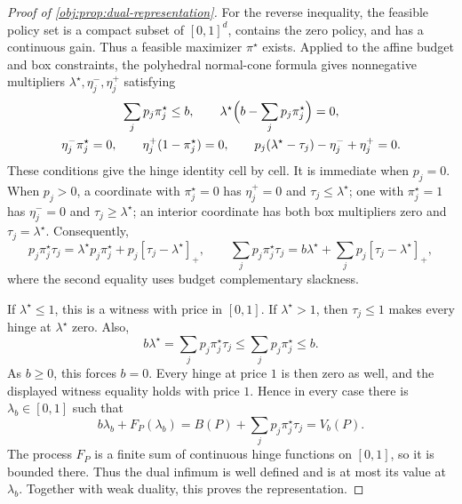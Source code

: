 \documentclass[11pt]{article}
\begin{document}
\begin{proof}[Proof of \cref{obj:prop:dual-representation}]
For the reverse inequality, the feasible policy set is a compact subset of \([0,1]^d\), contains the zero policy, and has a continuous gain. Thus a feasible maximizer \(\pi^\star\) exists. Applied to the affine budget and box constraints, the polyhedral normal-cone formula gives nonnegative multipliers \(\lambda^\star,\eta_j^-,\eta_j^+\) satisfying
\[
\begin{gathered}
\sum_jp_j\pi^\star_j\leq b,\qquad
\lambda^\star\Bigl(b-\sum_jp_j\pi^\star_j\Bigr)=0,\\
\eta_j^-\pi^\star_j=0,\qquad
\eta_j^+(1-\pi^\star_j)=0,\qquad
p_j(\lambda^\star-\tau_j)-\eta_j^-+\eta_j^+=0.
\end{gathered}
\] %
These conditions give the hinge identity cell by cell. It is immediate when \(p_j=0\). When \(p_j>0\), a coordinate with \(\pi^\star_j=0\) has \(\eta_j^+=0\) and \(\tau_j\leq\lambda^\star\); one with \(\pi^\star_j=1\) has \(\eta_j^-=0\) and \(\tau_j\geq\lambda^\star\); an interior coordinate has both box multipliers zero and \(\tau_j=\lambda^\star\). Consequently,
\[
p_j\pi^\star_j\tau_j
=\lambda^\star p_j\pi^\star_j
 +p_j[\tau_j-\lambda^\star]_+,
\qquad
\sum_jp_j\pi^\star_j\tau_j
=b\lambda^\star+\sum_jp_j[\tau_j-\lambda^\star]_+,
\]
where the second equality uses budget complementary slackness. %

If \(\lambda^\star\leq1\), this is a witness with price in \([0,1]\). If \(\lambda^\star>1\), then \(\tau_j\leq1\) makes every hinge at \(\lambda^\star\) zero. Also,
\[
b\lambda^\star
=\sum_jp_j\pi^\star_j\tau_j
\leq\sum_jp_j\pi^\star_j
\leq b.
\]
As \(b\geq0\), this forces \(b=0\). Every hinge at price \(1\) is then zero as well, and the displayed witness equality holds with price \(1\). Hence in every case there is \(\lambda_b\in[0,1]\) such that
\[
b\lambda_b+F_P(\lambda_b)
=B(P)+\sum_jp_j\pi^\star_j\tau_j
=V_b(P).
\] %
The process \(F_P\) is a finite sum of continuous hinge functions on \([0,1]\), so it is bounded there. Thus the dual infimum is well defined and is at most its value at \(\lambda_b\). Together with weak duality, this proves the representation. %


\end{proof}
\end{document}
